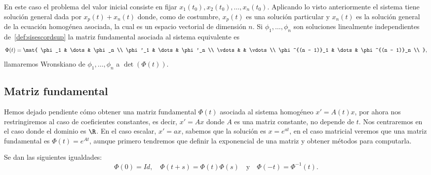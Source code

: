 \documentclass[../main.tex]{subfiles}
\begin{document}
En este caso el problema del valor inicial consiste en fijar \(x_1(t_0), 
x_2(t_0), \dots, x_n(t_0)\). Aplicando lo visto anteriormente el sistema tiene
solución general dada por \(x_p(t) + x_n(t)\) donde, como de costumbre, 
\(x_p(t)\) es una solución particular y \(x_n(t)\) es la solución general de la
ecuación homogénea asociada, la cual es un espacio vectorial de dimensión \(n\).
Si \(\phi_1, \dots, \phi_n\) son soluciones linealmente independientes 
de~\ref{def:sisescordsup} la matriz fundamental asociada al sistema equivalente
es
\[\Phi(t) = \mat{
	\phi_1 & \dots & \phi_n \\ 
	\phi'_1 & \dots & \phi'_n \\ 
	\vdots & & \vdots \\ 
	\phi^{(n - 1)}_1 & \dots & \phi^{(n - 1)}_n \\ 
	},\]
llamaremos Wronskiano de \(\phi_1, \dots, \phi_n\) a \(\det(\Phi(t))\).

\subsection{Matriz fundamental}

Hemos dejado pendiente cómo obtener una matriz fundamental \(\Phi(t)\) asociada
al sistema homogéneo \(x' = A(t)x\), por ahora nos restringiremos al caso de
coeficientes constantes, es decir, \(x' = Ax\) donde \(A\) es una matriz
constante, no depende de \(t\). Nos centraremos en el caso donde el dominio es 
\(\R\). En el caso escalar, \(x' = ax\), sabemos que la solución es 
\(x = e^{at}\), en el caso matricial veremos que una matriz fundamental es
\(\Phi(t) = e^{At}\), aunque primero tendremos que definir la exponencial de una
matriz y obtener métodos para computarla.

\begin{theorem}
	Se dan las siguientes igualdades:
	\[
		\Phi(0) = \mathit{Id}, \quad
		\Phi(t + s) = \Phi(t) \Phi(s) \quad \text{y} \quad
		\Phi(-t) = \Phi^{-1}(t).
	\]
\end{theorem}
\end{document}
